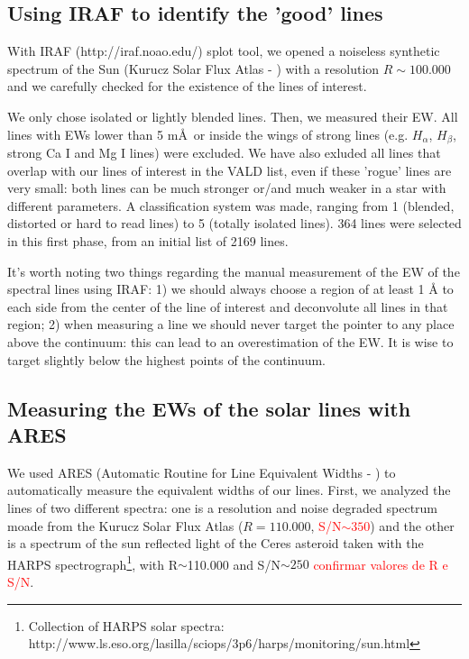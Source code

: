 \documentclass[dvips,12pt,a4paper]{report}
\begin{document}
{%

\subsection {Using IRAF to identify the 'good' lines}
\label{idiraf}
With IRAF (http://iraf.noao.edu/) splot tool, we opened a noiseless synthetic spectrum of the Sun (Kurucz Solar Flux Atlas - \citet{Kurucz-1984} ) with a resolution $R\sim100.000$ and we carefully checked for the existence of the lines of interest.

We only chose isolated or lightly blended lines. Then, we measured their EW. All lines with EWs lower than 5 m\AA\, or inside the wings of strong lines (e.g. $H_\alpha$, $H_\beta$, strong Ca I and Mg I lines) were excluded. We have also exluded all lines that overlap with our lines of interest in the VALD list, even if these 'rogue' lines are very small: both lines can be much stronger or/and much weaker in a star with different parameters. A classification system was made, ranging from 1 (blended, distorted or hard to read lines) to 5 (totally isolated lines). 364 lines were selected in this first phase, from an initial list of 2169 lines. 

It's worth noting two things regarding the manual measurement of the EW of the spectral lines using IRAF: 1) we should always choose a region of at least 1 \AA{} to each side from the center of the line of interest and deconvolute all lines in that region; 2) when measuring a line we should never target the pointer to any place above the continuum: this can lead to an overestimation of the EW. It is wise to target slightly below the highest points of the continuum.

\subsection {Measuring the EWs of the solar lines with ARES}
\label{ARES}
We used ARES (Automatic Routine for Line Equivalent Widths - \citep{Sousa-2007}) to automatically measure the equivalent widths of our lines. First, we analyzed the lines of two different spectra: one is a resolution and noise degraded spectrum moade from the Kurucz Solar Flux Atlas ($R=110.000$, \textcolor{red}{S/N$\sim350$}) and the other is a spectrum of the sun reflected light of the Ceres asteroid taken with the HARPS spectrograph\footnote{Collection of HARPS solar spectra: http://www.ls.eso.org/lasilla/sciops/3p6/harps/monitoring/sun.html}, with R$\sim$110.000 and S/N$\sim250$ \textcolor{red}{confirmar valores de R e S/N}.



}
\end{document}
